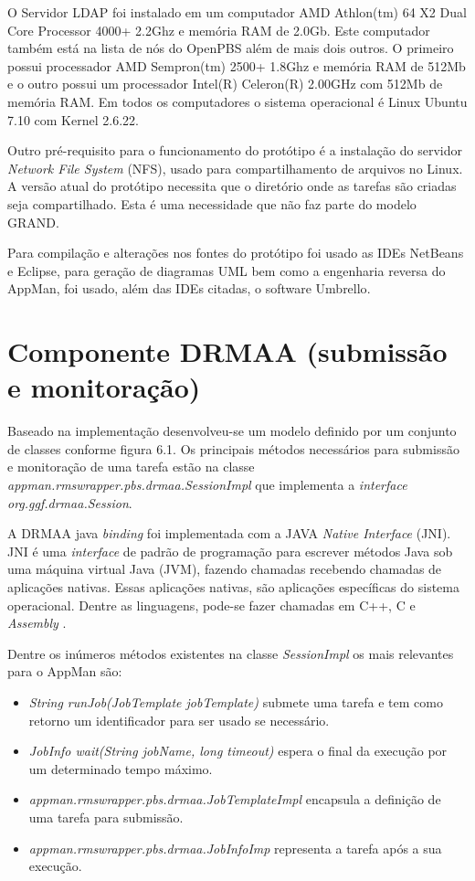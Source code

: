O Servidor LDAP foi instalado em um computador AMD Athlon(tm) 64 X2 Dual Core Processor 4000+ 2.2Ghz e memória RAM de 2.0Gb. Este computador também está na lista de nós do OpenPBS além de mais dois outros. O primeiro possui processador AMD Sempron(tm) 2500+ 1.8Ghz e memória RAM de 512Mb e o outro possui um processador Intel(R) Celeron(R) 2.00GHz com 512Mb de memória RAM. Em todos os computadores o sistema operacional é Linux Ubuntu 7.10 com Kernel 2.6.22.

Outro pré-requisito para o funcionamento do protótipo é a instalação do servidor \emph{Network File System} (NFS), usado para compartilhamento de arquivos no Linux. A versão atual do protótipo necessita que o diretório onde as tarefas são criadas seja compartilhado. Esta é uma necessidade que não faz parte do modelo GRAND.

Para compilação e alterações nos fontes do protótipo foi usado as IDEs NetBeans\cite{netbeans} e Eclipse\cite{eclipse}, para geração de diagramas UML bem como a engenharia reversa do AppMan, foi usado, além das IDEs citadas, o software Umbrello\cite{umbrello}.

\section{Componente DRMAA (submissão e monitoração)}

Baseado na implementação desenvolveu-se um modelo definido por um conjunto de classes conforme figura 6.1. Os principais métodos necessários para submissão e monitoração de uma tarefa estão na classe \emph{appman.rmswrapper.pbs.drmaa.SessionImpl} que implementa a \emph{interface} \emph{org.ggf.drmaa.Session}.

A DRMAA java \emph{binding} foi implementada com a JAVA \emph{Native Interface} (JNI). JNI é uma \emph{interface} de padrão de programação para escrever métodos Java sob uma máquina virtual Java (JVM), fazendo chamadas recebendo chamadas de aplicações nativas. Essas aplicações nativas, são aplicações específicas do sistema operacional. Dentre as linguagens, pode-se fazer chamadas em C++, C e \emph{Assembly} \cite{jni}.

Dentre os inúmeros métodos existentes na classe \emph{SessionImpl} os mais relevantes para o AppMan são:

\begin{itemize}
	\item \emph{String runJob(JobTemplate jobTemplate)} submete uma tarefa e tem como retorno um identificador para ser usado se necessário.
	\item \emph{JobInfo wait(String jobName, long timeout)} espera o final da execução por um determinado tempo máximo.
	\item \emph{appman.rmswrapper.pbs.drmaa.JobTemplateImpl} encapsula a definição de uma tarefa para submissão.
	\item \emph{appman.rmswrapper.pbs.drmaa.JobInfoImp} representa a tarefa após a sua execução.
\end{itemize}

